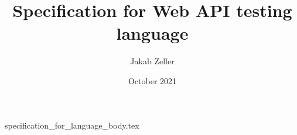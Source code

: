 \documentclass[12pt, letterpaper]{article}
\title{Specification for Web API testing language}
\author{Jakab Zeller}
\date{October 2021}
\begin{document}
\maketitle

{specification_for_language_body.tex}
\end{document}
